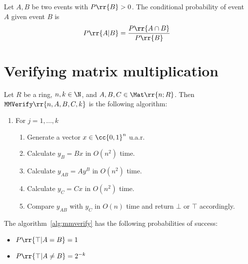 \documentclass{article}
\begin{document}
\begin{definition}
  \label{def:conditiona-probability}
  Let $A,B$ be two events with $P \rr{ B } > 0$. The conditional probability
  of event $A$ given event $B$ is
  \begin{align*}
    P \rr{ A | B } = \frac{P \rr{ A \cap B }}{ P \rr{ B } }
  \end{align*}
\end{definition}


\section{Verifying matrix multiplication}

\begin{algorithm}\label{alg:mmverify}
  Let $R$ be a ring, $n,k\in\N$, and $A,B,C\in\Mat \rr{ n; R }$. Then
  $\texttt{MMVerify} \rr{ n, A, B, C, k }$ is the following algorithm:
  \begin{enumerate}
    \item For $j=1,...,k$ \begin{enumerate}
      \item Generate a vector $x\in \cc{ 0,1 }^n$ u.a.r.
      \item Calculate $y_B = Bx$ in $O(n^2)$ time.
      \item Calculate $y_{AB} = Ay^B$ in $O(n^2)$ time.
      \item Calculate $y_C = Cx$ in $O(n^2)$ time.
      \item Compare $y_{AB}$ with $y_C$ in $O(n)$ time and return $\bot$ or $\top$ accordingly.
    \end{enumerate}
\end{enumerate}
\end{algorithm}

\begin{theorem}
  \label{thm:mmverify-proabilities}
  The algorithm~\ref{alg:mmverify} has the following probabilities of success:
  \begin{itemize}
    \item $P \rr{ \top | A = B } = 1$
    \item $P \rr{ \top | A \not= B } = 2^{-k}$
  \end{itemize}
\end{theorem}
\end{document}
